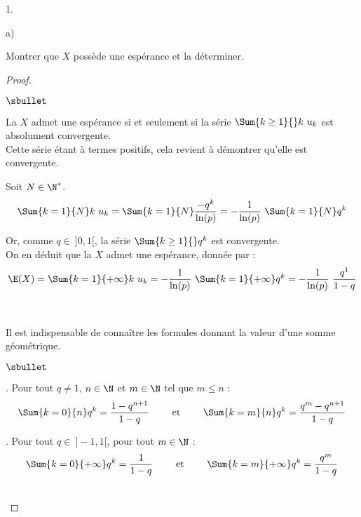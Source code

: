 \documentclass[11pt]{article}%
\begin{document}
\begin{noliste}{1.}
\item
  \begin{noliste}{a)}
    \setlength{\itemsep}{2mm}
  \item Montrer que $X$ possède une espérance et la déterminer.

    \begin{proof}~%
      \begin{noliste}{$\sbullet$}
      \item La \var $X$ admet une espérance si et seulement si la
        série $\Sum{k \geq 1}{} k \ u_k$ est absolument convergente.\\
        Cette série étant à termes positifs, cela revient à démontrer
        qu'elle est convergente.

      \item Soit $N \in \N^*$.
        \[
        \Sum{k = 1}{N} k \ u_k = \Sum{k = 1}{N} \dfrac{-q^k}{\ln(p)} =
        -\dfrac{1}{\ln(p)} \ \Sum{k = 1}{N} q^k
        \]

      \item Or, comme $q \in \ ]0, 1[$, la série $\Sum{k \geq 1}{}
        q^k$ est convergente.\\
        On en déduit que la \var $X$ admet une espérance, donnée par : 
        \[
        \E(X) = \Sum{k=1}{+\infty} k \ u_k = -\dfrac{1}{\ln(p)}
        \ \Sum{k=1}{+\infty} q^k = -\dfrac{1}{\ln(p)} \ \dfrac{q^1}{1-q}
        \]
      \end{noliste}
      ~\\[-1.1cm]
      \begin{remarkL}{.95}
        Il est indispensable de connaître les formules donnant la
        valeur d'une somme géométrique.
        \begin{noliste}{$\sbullet$}
        \item {}. Pour tout $q
          \neq 1$, $n \in \N$ et $m \in \N$ tel que $m \leq n$ :
          \[
          \Sum{k = 0}{n} q^k = \dfrac{1 - q^{n+1}}{1-q} %
          \qquad \text{ et } \qquad %
          \Sum{k = m}{n} q^k = \dfrac{q^m - q^{n+1}}{1-q}
          \]
          
        \item {}. Pour tout
          $q \in \ ]-1, 1[$, pour tout $m \in \N$ :
          \[
          \Sum{k = 0}{+\infty} q^k = \dfrac{1}{1-q}%
          \qquad \text{ et } \qquad %
          \Sum{k = m}{+\infty} q^k = \dfrac{q^m}{1-q}
          \]
        \end{noliste}
      \end{remarkL}~\\[-1.2cm]
    \end{proof}



\end{noliste}
\end{noliste}
\end{document}
